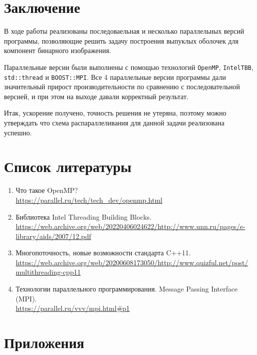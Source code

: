 \documentclass[12pt]{article}
\begin{document}
\newpage

\section{Заключение}
В ходе работы реализованы последоваельная и несколько параллельных версий программы, позволяющие решить задачу построения выпуклых оболочек для компонент бинарного изображения.

Параллельные версии были выполнены с помощью технологий \texttt{OpenMP}, \texttt{IntelTBB}, \texttt{std::thread} и \texttt{BOOST::MPI}. Все 4 параллельные версии программы дали значительный прирост производительности по сравнению с последовательной версией, и при этом на выходе давали корректный результат.

Итак, ускорение получено, точность решения не утеряна, поэтому можно утверждать что схема распараллеливания для данной задачи реализована успешно.

\newpage

\section{Список литературы}
\begin{enumerate}
\item Что такое OpenMP? \\ 
\url{https://parallel.ru/tech/tech_dev/openmp.html}
\item Библиотека Intel Threading Building Blocks. \\ 
\url{https://web.archive.org/web/20220406024622/http://www.unn.ru/pages/e-library/aids/2007/12.pdf}
\item Многопоточность, новые возможности стандарта C++11. \\ 
\url{https://web.archive.org/web/20200608173050/http://www.quizful.net/post/multithreading-cpp11}
\item Технологии параллельного программирования. Message Passing Interface (MPI). \\ 
\url{https://parallel.ru/vvv/mpi.html#p1}
\end{enumerate}

\newpage

\section{Приложения}
\end{document}
